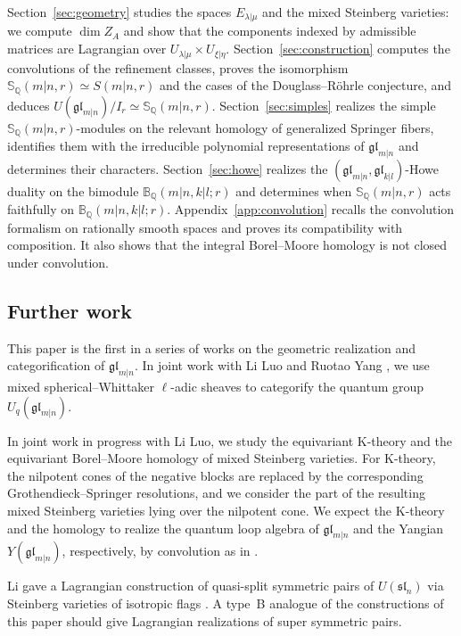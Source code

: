 \documentclass[11pt,a4paper]{amsart}
\theoremstyle{definition}
\theoremstyle{remark}
\newcommand{\Q}{\mathbb Q}
\newcommand{\bS}{\mathbb S}
\newcommand{\bB}{\mathbb B}
\newcommand{\lm}{\lambda|\mu}
\newcommand{\xh}{\xi|\eta}
\numberwithin{equation}{section}
\begin{document}
Section~\ref{sec:geometry} studies the spaces $E_{\lm}$ and the mixed
Steinberg varieties: we compute $\dim Z_A$ and show that the components
indexed by admissible matrices are Lagrangian over
$U_{\lm}\times U_{\xh}$. Section~\ref{sec:construction} computes the
convolutions of the refinement classes, proves the isomorphism
$\bS_\Q(m|n,r)\simeq S(m|n,r)$ and the cases of the Douglass--R\"ohrle
conjecture, and deduces $U(\mathfrak{gl}_{m|n})/I_r\simeq\bS_\Q(m|n,r)$.
Section~\ref{sec:simples} realizes the simple $\bS_\Q(m|n,r)$-modules on the
relevant homology of generalized Springer fibers, identifies them with
the irreducible polynomial representations of $\mathfrak{gl}_{m|n}$ and
determines their characters.
Section~\ref{sec:howe} realizes the
$(\mathfrak{gl}_{m|n},\mathfrak{gl}_{k|l})$-Howe duality on the bimodule
$\bB_\Q(m|n,k|l;r)$ and determines when $\bS_\Q(m|n,r)$ acts faithfully on $\bB_\Q(m|n,k|l;r)$.
Appendix~\ref{app:convolution} recalls the convolution formalism
on rationally smooth spaces and proves its compatibility with composition.
It also shows that the integral Borel--Moore homology is not closed
under convolution.

\subsection{Further work}
\label{sec:further}
This paper is the first in a series of works on the geometric
realization and categorification of $\mathfrak{gl}_{m|n}$.
In joint work with Li Luo and Ruotao Yang \cite{LYY}, we use mixed
spherical--Whittaker $\ell$-adic sheaves to categorify the quantum group
$U_q(\mathfrak{gl}_{m|n})$.

In joint work in progress with Li Luo, we study the equivariant K-theory
and the equivariant Borel--Moore homology of mixed Steinberg varieties.
For K-theory, the nilpotent cones of the negative blocks are replaced by
the corresponding Grothendieck--Springer resolutions, and we consider the
part of the resulting mixed Steinberg varieties lying over the nilpotent
cone. We expect the K-theory and the homology to realize
the quantum loop algebra of $\mathfrak{gl}_{m|n}$ and
the Yangian $Y(\mathfrak{gl}_{m|n})$, respectively, by convolution as in \cite{GV93,Vas98}.

Li gave a Lagrangian construction of quasi-split symmetric pairs of
$U(\mathfrak{sl}_n)$ via Steinberg varieties of isotropic flags \cite{Li21}.
A type~B analogue of the constructions of this paper should give
Lagrangian realizations of super symmetric pairs.
\end{document}
